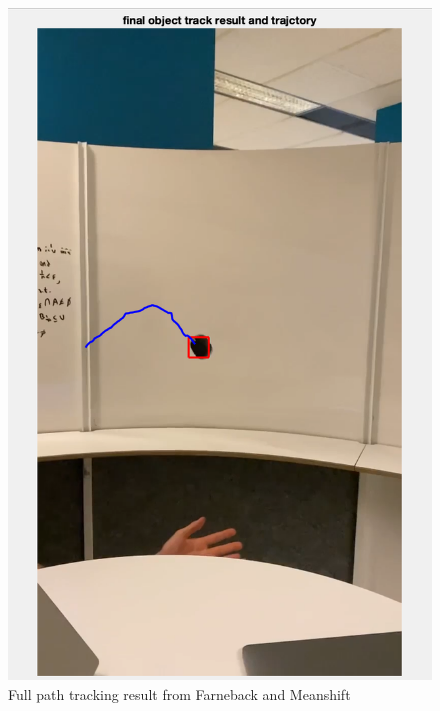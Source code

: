\documentclass[12pt]{article}
\begin{document}
\begin{figure}[h]
  \centering
    \includegraphics[scale=0.4]{figures/full1.png}
    \caption{Full path tracking result from Farneback and Meanshift}
    \label{full path}
\end{figure}
\end{document}
